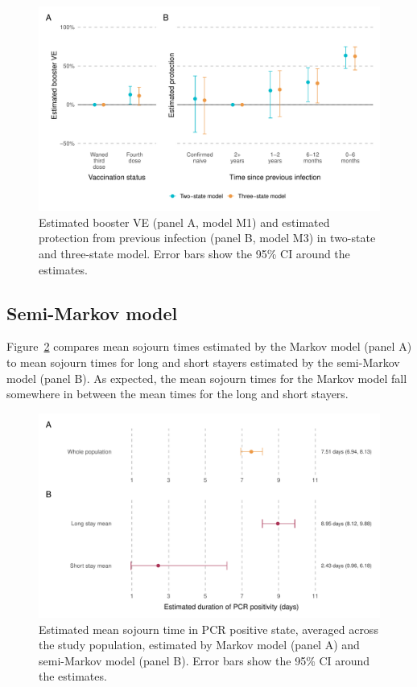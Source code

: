 \begin{figure}[htbp!]
    \centering
    \includegraphics[width=\textwidth]{ve_convalescent.pdf}
    \caption[Estimated booster VE and estimated protection from previous infection in two-state and three-state model]{Estimated booster VE (panel A, model M1) and estimated protection from previous infection (panel B, model M3) in two-state and three-state model. Error bars show the 95\% CI around the estimates.}\label{fig:ve_convalescent}
\end{figure}

\subsection{Semi-Markov model}

Figure~\ref{fig:sojourn_semi_markov} compares mean sojourn times estimated by the Markov model (panel A) to mean sojourn times for long and short stayers estimated by the semi-Markov model (panel B). As expected, the mean sojourn times for the Markov model fall somewhere in between the mean times for the long and short stayers.

\begin{figure}[htbp!]
    \centering
    \includegraphics[width=\textwidth]{sojourn_semi_markov.pdf}
    \caption[Estimated mean sojourn time in PCR positive state, averaged across the study population, estimated by Markov and semi-Markov model]{Estimated mean sojourn time in PCR positive state, averaged across the study population, estimated by Markov model (panel A) and semi-Markov model (panel B). Error bars show the 95\% CI around the estimates.}\label{fig:sojourn_semi_markov}
\end{figure}


